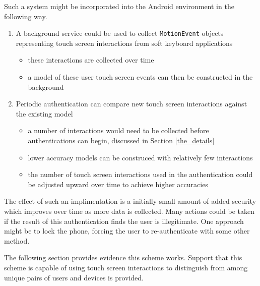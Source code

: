 Such a system might be incorporated 
into the Android environment in the following way.
\begin{enumerate}
\item A background service could be used to collect {\tt MotionEvent} objects
  representing touch screen interactions
  from soft keyboard applications
  \begin{itemize}
  \item these interactions are collected over time
  \item a model of these user touch screen events
    can then be constructed in the background
  \end{itemize}
\item Periodic authentication can compare new touch screen interactions
  against the existing model
  \begin{itemize}
  \item a number of interactions would need to be collected
    before authentications can begin,
    discussed in Section \ref{the_details}
  \item lower accuracy models can be construced with
    relatively few interactions
  \item the number of touch screen interactions used in the
    authentication could be adjusted upward over time to
    achieve higher accuracies
  \end{itemize}
\end{enumerate}
The effect of such an implimentation
is a initially small amount of added
security which improves over time
as more data is collected.
%
Many actions could be taken if the result of this authentication
finds the user is illegitimate.
One approach might be to lock the phone,
forcing the user to re-authenticate with some other method.

The following section provides evidence 
this scheme works.
Support that this scheme is capable of using
touch screen interactions to distinguish from
among unique pairs of users and devices is provided.
